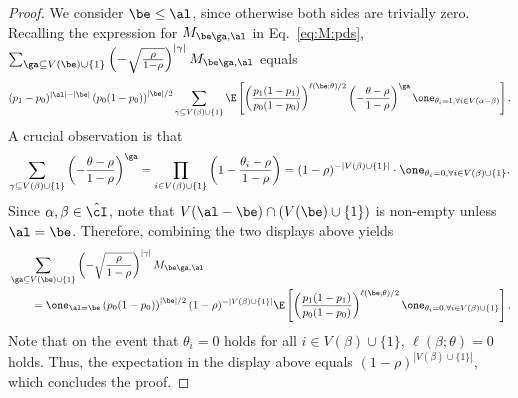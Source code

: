 \documentclass[11pt]{article}
\begin{document}
\begin{proof}
We consider $\be\le \al$, since otherwise both sides are trivially zero.
Recalling the expression for $M_{\be\ga,\al}$ in Eq.~\eqref{eq:M:pds}, $\sum_{\ga \subseteq V(\be)\cup\{1\}}\left(-\sqrt{\frac{\rho}{1-\rho}}\right)^{|\gamma|}M_{\be\ga,\al}$ equals 
\[
(p_1-p_0)^{|\al|-|\be|}\left(p_0(1-p_0)\right)^{|\be|/2}\sum_{\gamma\subseteq V(\beta)\cup \{1\}}\E\left[\left(\frac{p_1(1-p_1)}{p_0(1-p_0)}\right)^{\ell(\be;\theta)/2}\left(-\frac{\theta-\rho}{1-\rho}\right)^{\ga}\one_{\theta_i=1,\forall i \in V(\alpha-\beta)}\right].
\]
A crucial observation is that
\[
\sum_{\gamma\subseteq V(\beta)\cup \{1\}}\left(-\frac{\theta-\rho}{1-\rho}\right)^{\ga}=\prod_{i\in V(\beta)\cup\{1\}}\left(1-\frac{\theta_i-\rho}{1-\rho}\right)=(1-\rho)^{-|V(\beta)\cup\{1\}|}\cdot \one_{\theta_i=0,\forall i \in V(\beta)\cup\{1\}}.
\]
Since $\alpha, \beta\in \hat\cI$, note that $V(\al-\be)\cap (V(\be)\cup\{1\})$ is non-empty unless $\al=\be$. Therefore, combining the two displays above yields
\[
\begin{split}
&\sum_{\ga \subseteq V(\be)\cup\{1\}}\left(-\sqrt{\frac{\rho}{1-\rho}}\right)^{|\gamma|}M_{\be\ga,\al}\\
&\qquad=\one_{\al=\be} \left(p_0(1-p_0)\right)^{|\be|/2} (1-\rho)^{-|V(\beta)\cup\{1\}|}\E\left[\left(\frac{p_1(1-p_1)}{p_0(1-p_0)}\right)^{\ell(\be;\theta)/2}\one_{\theta_i=0,\forall i \in V(\beta)\cup\{1\}}\right].
\end{split}
\]
Note that on the event that $\theta_i=0$ holds for all $i\in V(\beta)\cup \{1\}$, $\ell(\beta;\theta)=0$ holds. Thus, the expectation in the display above equals $(1-\rho)^{|V(\beta)\cup \{1\}|}$, which concludes the proof. 
\end{proof}
\end{document}
